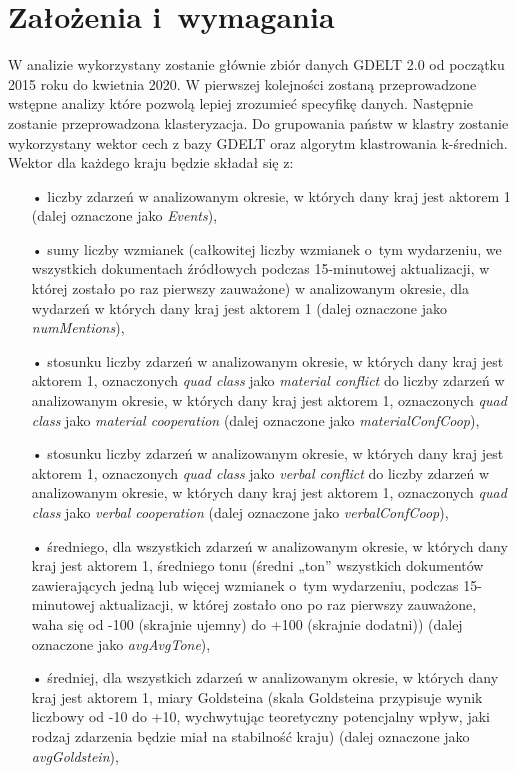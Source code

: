 \documentclass[11pt]{report}
\begin{document}
    \section{Założenia i~wymagania}\label{sec:założenia-i-wymagania}
    W analizie wykorzystany zostanie głównie zbiór danych GDELT 2.0 od początku 2015 roku do kwietnia 2020.
    W pierwszej kolejności zostaną przeprowadzone wstępne analizy które pozwolą lepiej zrozumieć specyfikę danych.
    Następnie zostanie przeprowadzona klasteryzacja.
    Do grupowania państw w klastry zostanie wykorzystany wektor cech z bazy GDELT oraz algorytm klastrowania k-średnich.
    Wektor dla każdego kraju będzie składał się z:
    \begin{enumerate}
        \item[•] liczby zdarzeń w analizowanym okresie, w których dany kraj jest aktorem 1 (dalej oznaczone jako \textit{Events}),
        \item[•] sumy liczby wzmianek (całkowitej liczby wzmianek o~tym wydarzeniu, we wszystkich dokumentach źródłowych podczas 15-minutowej aktualizacji, w której zostało po raz pierwszy zauważone) w analizowanym okresie, dla wydarzeń w których dany kraj jest aktorem 1 (dalej oznaczone jako \textit{numMentions}),
        \item[•] stosunku liczby zdarzeń w analizowanym okresie, w których dany kraj jest aktorem 1, oznaczonych \textit{quad class} jako \textit{material conflict} do liczby zdarzeń w analizowanym okresie, w których dany kraj jest aktorem 1, oznaczonych \textit{quad class} jako \textit{material cooperation} (dalej oznaczone jako \textit{materialConfCoop}),
        \item[•] stosunku liczby zdarzeń w analizowanym okresie, w których dany kraj jest aktorem 1, oznaczonych \textit{quad class} jako \textit{verbal conflict} do liczby zdarzeń w analizowanym okresie, w których dany kraj jest aktorem 1, oznaczonych \textit{quad class} jako \textit{verbal cooperation} (dalej oznaczone jako \textit{verbalConfCoop}),
        \item[•] średniego, dla wszystkich zdarzeń w analizowanym okresie, w których dany kraj jest aktorem 1, średniego tonu (średni „ton” wszystkich dokumentów zawierających jedną lub więcej wzmianek o~tym wydarzeniu, podczas 15-minutowej aktualizacji, w której zostało ono po raz pierwszy zauważone, waha się od -100 (skrajnie ujemny) do +100 (skrajnie dodatni)) (dalej oznaczone jako \textit{avgAvgTone}),
        \item[•] średniej, dla wszystkich zdarzeń w analizowanym okresie, w których dany kraj jest aktorem 1, miary Goldsteina (skala Goldsteina przypisuje wynik liczbowy od -10 do +10, wychwytując teoretyczny potencjalny wpływ, jaki rodzaj zdarzenia będzie miał na stabilność kraju) (dalej oznaczone jako \textit{avgGoldstein}),

\end{enumerate}
\end{document}
